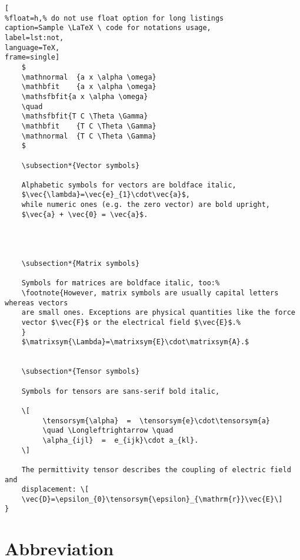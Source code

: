 \begin{lstlisting}[
%float=h,% do not use float option for long listings
caption=Sample \LaTeX \ code for notations usage, 
label=lst:not,
language=TeX,
frame=single]
	$
	\mathnormal  {a x \alpha \omega}
	\mathbfit    {a x \alpha \omega}
	\mathsfbfit{a x \alpha \omega}
	\quad
	\mathsfbfit{T C \Theta \Gamma}
	\mathbfit    {T C \Theta \Gamma}
	\mathnormal  {T C \Theta \Gamma}
	$

	\subsection*{Vector symbols}

	Alphabetic symbols for vectors are boldface italic,
	$\vec{\lambda}=\vec{e}_{1}\cdot\vec{a}$,
	while numeric ones (e.g. the zero vector) are bold upright,
	$\vec{a} + \vec{0} = \vec{a}$.




	\subsection*{Matrix symbols}

	Symbols for matrices are boldface italic, too:%
	\footnote{However, matrix symbols are usually capital letters whereas vectors
	are small ones. Exceptions are physical quantities like the force
	vector $\vec{F}$ or the electrical field $\vec{E}$.%
	}
	$\matrixsym{\Lambda}=\matrixsym{E}\cdot\matrixsym{A}.$


	\subsection*{Tensor symbols}

	Symbols for tensors are sans-serif bold italic,

	\[
		 \tensorsym{\alpha}  =  \tensorsym{e}\cdot\tensorsym{a}
		 \quad \Longleftrightarrow \quad
		 \alpha_{ijl}  =  e_{ijk}\cdot a_{kl}.
	\]

	The permittivity tensor describes the coupling of electric field and
	displacement: \[
	\vec{D}=\epsilon_{0}\tensorsym{\epsilon}_{\mathrm{r}}\vec{E}\]
}

\end{lstlisting}
\cleardoublepage











\newpage
\section*{Abbreviation}\
\label{sec:abbrv}

